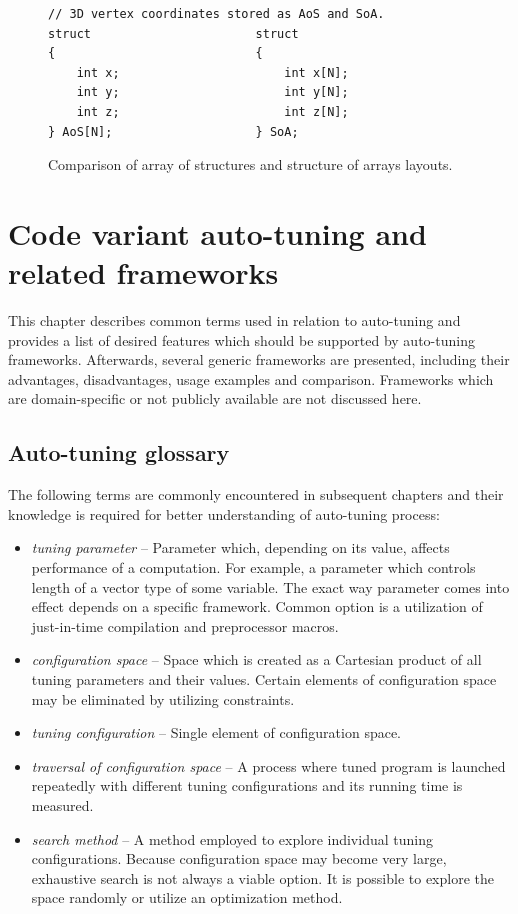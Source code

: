 \documentclass
[
    digital, %
    oneside, %
    table, %
    nolof, %
    nolot, %
    nocover %
]{fithesis3}
\begin{document}
\begin{figure}
\begin{lstlisting}
// 3D vertex coordinates stored as AoS and SoA.
struct                       struct
{                            {
    int x;                       int x[N];
    int y;                       int y[N];
    int z;                       int z[N];
} AoS[N];                    } SoA;
\end{lstlisting}
\caption{Comparison of array of structures and structure of arrays layouts.}
\label{aos_soa}
\end{figure}

\chapter{Code variant auto-tuning and related frameworks}
This chapter describes common terms used in relation to auto-tuning and provides a list of desired features which should be supported by auto-tuning
frameworks. Afterwards, several generic frameworks are presented, including their advantages, disadvantages, usage examples and comparison. Frameworks
which are domain-specific or not publicly available are not discussed here.

\section{Auto-tuning glossary}
The following terms are commonly encountered in subsequent chapters and their knowledge is required for better understanding of auto-tuning process:
\begin{itemize}
    \item \textit{tuning parameter} -- Parameter which, depending on its value, affects performance of a computation. For example, a parameter which
    controls length of a vector type of some variable. The exact way parameter comes into effect depends on a specific framework. Common option is
    a utilization of just-in-time compilation and preprocessor macros.
    \item \textit{configuration space} -- Space which is created as a Cartesian product of all tuning parameters and their values. Certain elements of
    configuration space may be eliminated by utilizing constraints.
    \item \textit{tuning configuration} -- Single element of configuration space.
    \item \textit{traversal of configuration space} -- A process where tuned program is launched repeatedly with different tuning configurations and
    its running time is measured.
    \item \textit{search method} -- A method employed to explore individual tuning configurations. Because configuration space may become very large,
    exhaustive search is not always a viable option. It is possible to explore the space randomly or utilize an optimization method.
\end{itemize}
\end{document}
